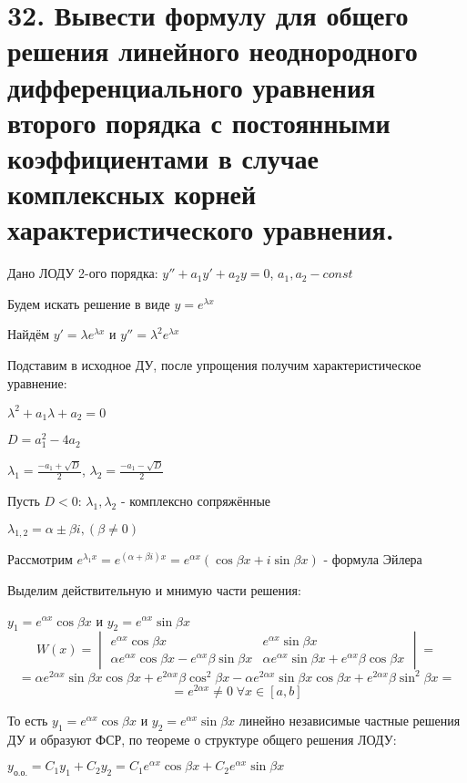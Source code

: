 \documentclass[11pt]{article}
\begin{document}
\section*{32. Вывести формулу для общего решения линейного неоднородного дифференциального уравнения второго порядка с постоянными коэффициентами в случае комплексных корней характеристического уравнения.}
\par Дано ЛОДУ 2-ого порядка: $y'' + a_{1}y' + a_{2}y = 0$, $a_{1}, a_{2} - const$
\par Будем искать решение в виде $y = e^{\lambda x}$
\par Найдём $y' = \lambda e^{\lambda x}$ и $y'' = \lambda^2 e^{\lambda x}$
\par Подставим в исходное ДУ, после упрощения получим характеристическое уравнение:
\par $\lambda^2 + a_{1} \lambda + a_{2} = 0$
\par $D = a_{1}^2 - 4a_{2}$
\par $\lambda_{1} = \frac{-a_{1} + \sqrt{ D }}{2}$, $\lambda_{2} = \frac{-a_{1} - \sqrt{ D }}{2}$
\par Пусть $D < 0$: $\lambda_{1}, \lambda_{2}$ - комплексно сопряжённые
\par $\lambda_{1, 2} = \alpha \pm \beta i, (\beta \neq 0)$
\par Рассмотрим $e^{\lambda_{1}x} = e^{(\alpha + \beta i)x} = e^{\alpha x}(\cos \beta x + i\sin \beta x)$ - формула Эйлера
\par Выделим действительную и мнимую части решения:
\par $y_{1} = e^{\alpha x} \cos \beta x$ и $y_{2} = e^{\alpha x} \sin \beta x$
$$W(x) = \begin{vmatrix}
e^{\alpha x} \cos \beta x & e^{\alpha x} \sin \beta x \\
\alpha e^{\alpha x} \cos \beta x - e^{\alpha x} \beta \sin \beta x & \alpha e^{\alpha x} \sin \beta x + e^{\alpha x} \beta \cos \beta x
\end{vmatrix} =$$ 
$$= \alpha e^{2\alpha x} \sin \beta x \cos \beta x + e^{2\alpha x} \beta \cos^2 \beta x - \alpha e^{2\alpha x} \sin \beta x \cos \beta x + e^{2\alpha x} \beta \sin^2 \beta x =$$
$$= e^{2\alpha x}\neq 0 \; \forall x \in [a, b]$$
\par То есть $y_{1} = e^{\alpha x} \cos \beta x$ и $y_{2} = e^{\alpha x} \sin \beta x$ линейно независимые частные решения ДУ и образуют ФСР, по теореме о структуре общего решения ЛОДУ:
\par $y_{\text{о.о.}} = C_{1}y_{1} + C_{2}y_{2} = C_{1}e^{\alpha x} \cos \beta x + C_{2}e^{\alpha x} \sin \beta x$
\end{document}
